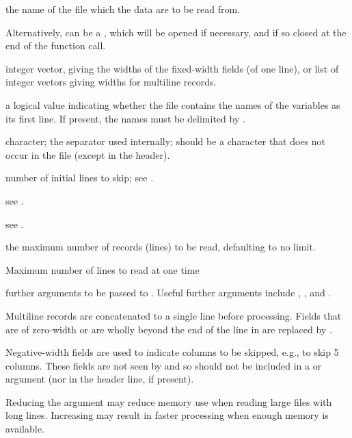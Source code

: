 \begin{Arguments}
\begin{ldescription}
\item[\code{file}] 
the name of the file which the data are to be read from.

Alternatively,  can be a , which
will be opened if necessary, and if so closed at the end of the
function call.

\item[\code{widths}] integer vector, giving the widths of the fixed-width
fields (of one line), or list of integer vectors giving widths for
multiline records.
\item[\code{header}] a logical value indicating whether the file contains the
names of the variables as its first line.  If present, the names
must be delimited by .
\item[\code{sep}] character; the separator used internally; should be a
character that does not occur in the file (except in the header).
\item[\code{skip}] number of initial lines to skip; see
.
\item[\code{row.names}] see .
\item[\code{col.names}] see .
\item[\code{n}] the maximum number of records (lines) to be read, defaulting
to no limit.
\item[\code{buffersize}] Maximum number of lines to read at one time
\item[\code{...}] further arguments to be passed to
.  Useful further arguments include
, ,  and .
\end{ldescription}
\end{Arguments}
%
\begin{Details}\relax
Multiline records are concatenated to a single line before processing.
Fields that are of zero-width or are wholly beyond the end of the line
in  are replaced by .

Negative-width fields are used to indicate columns to be skipped, e.g.,
 to skip 5 columns.  These fields are not seen by
 and so should not be included in a 
or  argument (nor in the header line, if present).

Reducing the  argument may reduce memory use when
reading large files with long lines.  Increasing  may
result in faster processing when enough memory is available.
\end{Details}
